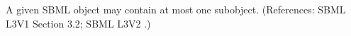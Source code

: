 A given SBML object may contain at most one \Notes subobject.  (References:
SBML L3V1 Section 3.2; SBML L3V2 .)

